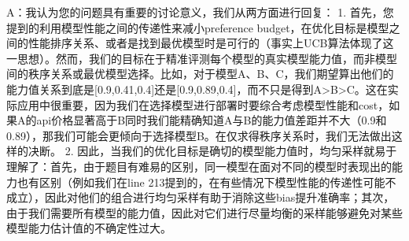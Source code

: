 A：我认为您的问题具有重要的讨论意义，我们从两方面进行回复：
1. 首先，您提到的利用模型性能之间的传递性来减小preference budget，在优化目标是模型之间的性能排序关系、或者是找到最优模型时是可行的（事实上UCB算法体现了这一思想）。然而，我们的目标在于精准评测每个模型的真实模型能力值，而非模型间的秩序关系或最优模型选择。比如，对于模型A、B、C，我们期望算出他们的能力值关系到底是[0.9,0.41,0.4]还是[0.9,0.89,0.4]，而不只是得到A>B>C。这在实际应用中很重要，因为我们在选择模型进行部署时要综合考虑模型性能和cost，如果A的api价格显著高于B同时我们能精确知道A与B的能力值差距并不大（0.9和0.89），那我们可能会更倾向于选择模型B。在仅求得秩序关系时，我们无法做出这样的决断。
2. 因此，当我们的优化目标是确切的模型能力值时，均匀采样就易于理解了：首先，由于题目有难易的区别，同一模型在面对不同的模型时表现出的能力也有区别（例如我们在line 213提到的，在有些情况下模型性能的传递性可能不成立），因此对他们的组合进行均匀采样有助于消除这些bias提升准确率；其次，由于我们需要所有模型的能力值，因此对它们进行尽量均衡的采样能够避免对某些模型能力估计值的不确定性过大。